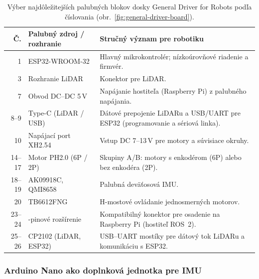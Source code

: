         {\footnotesize
        \begin{table}[H]
          \centering
          \begin{tabular}{@{}r >{\raggedright\arraybackslash}p{} >{\raggedright\arraybackslash}p{}@{}}
            \toprule
            Č. & Palubný zdroj / rozhranie & Stručný význam pre robotiku \\
            \midrule
            1 & ESP32-WROOM-32 & Hlavný mikrokontrolér; nízkoúrovňové riadenie a firmvér. \\
            \midrule
            3 & Rozhranie LiDAR & Konektor pre LiDAR. \\
            \midrule
            7 & Obvod DC--DC 5\,V & Napájanie hostiteľa (Raspberry Pi) z palubného napájania. \\
            \midrule
            8--9 & Type-C (LiDAR / USB) & Dátové prepojenie LiDARu a USB/UART pre ESP32 (programovanie a sériová linka). \\
            \midrule
            10 & Napájací port XH2.54 & Vstup DC 7--13\,V pre motory a súvisiace okruhy. \\
            \midrule
            14--17 & Motor PH2.0 (6P / 2P) & Skupiny A/B: motory s enkodérom (6P) alebo bez enkodéra (2P). \\
            \midrule
            18--19 & AK09918C, QMI8658 & Palubná deväťosová IMU. \\
            \midrule
            20 & TB6612FNG & H-mostové ovládanie jednosmerných motorov. \\
            \midrule
            23--24 & 40-pinové rozšírenie & Kompatibilný konektor pre osadenie na Raspberry Pi (hostiteľ ROS~2). \\
            \midrule
            25--26 & CP2102 (LiDAR, ESP32) & USB--UART mostíky pre dátový tok LiDARu a komunikáciu s ESP32. \\
            \bottomrule
          \end{tabular}
          \caption[Výber blokov General Driver]{Výber najdôležitejších palubných blokov dosky General Driver for Robots podľa číslovania (obr.~\ref{fig:general-driver-board}).}
          \label{tab:general-driver-onboard}
        \end{table}
        }
      
        \subsubsection*{Arduino Nano ako doplnková jednotka pre IMU}
      
